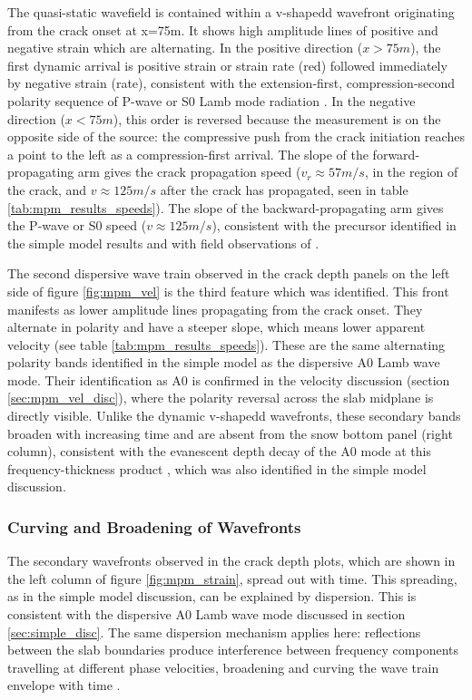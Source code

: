 The quasi-static wavefield is contained within a v-shapedd wavefront originating from the crack onset at x=75m. It shows high amplitude lines of positive and negative strain which are alternating. In the positive
direction ($x > 75m$), the first dynamic arrival is positive strain or strain rate (red)
followed immediately by negative strain (rate), consistent with the
extension-first, compression-second polarity sequence of P-wave or S0 Lamb
mode radiation \parencite{kAkiRichards19801981}. In the negative direction
($x < 75m$), this order is reversed because the measurement is on the
opposite side of the source: the compressive push from the crack initiation
reaches a point to the left as a compression-first arrival. The slope
of the forward-propagating arm gives the crack propagation speed
($v_r \approx 57m/s$, in the region of the crack, and  $v \approx
125m/s$ after the crack has propagated, seen in table \ref{tab:mpm_results_speeds}). The slope of
the backward-propagating arm gives the P-wave or S0 speed ($v \approx
125m/s$), consistent with the precursor identified in the simple model
results and with field observations of \cite{herwijnenSeismicSensorArray2011}. \par

The second dispersive wave train observed in the crack depth panels on the left side of figure \ref{fig:mpm_vel} is the third feature which was identified. This front manifests as lower amplitude lines propagating from the crack onset. They alternate in polarity and have a steeper slope, which means lower apparent velocity (see table \ref{tab:mpm_results_speeds}). These are the same alternating polarity bands identified in the simple model as the dispersive A0 Lamb wave mode. Their identification as A0 is confirmed in the velocity discussion (section \ref{sec:mpm_vel_disc}), where the polarity reversal across the slab midplane is directly visible. Unlike the dynamic v-shapedd wavefronts, these secondary bands broaden with increasing time and are absent from the snow bottom panel (right column), consistent with the evanescent depth decay of the A0 mode at this frequency-thickness product \parencite{roseWavesPlates2014}, which was also identified in the simple model discussion. \par 

\subsubsection{Curving and Broadening of Wavefronts}
The secondary wavefronts observed in the crack depth plots, which are shown in the left column of figure \ref{fig:mpm_strain}, spread out with time. This spreading, as in the simple model discussion, can be explained by dispersion. This is consistent with the dispersive A0 Lamb wave mode discussed in section \ref{sec:simple_disc}. The same dispersion mechanism applies here: reflections between the slab boundaries produce interference between frequency components travelling at different phase velocities, broadening and curving the wave train envelope with time \parencite{graffWaveMotionElastic1975}. \par 


